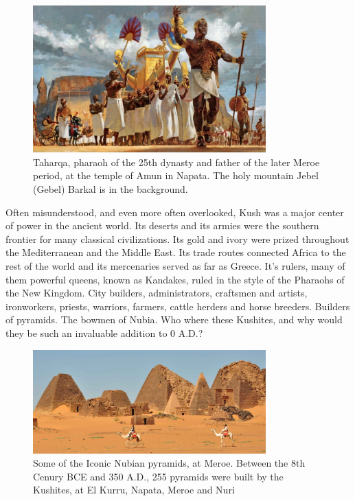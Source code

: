 \documentclass[a4paper,12pt]{scrreprt}
\begin{document}
\begin{figure}[H]
	\centering
	\includegraphics[width=0.8\textwidth]{img/taharqa_pharaoh}
	\caption{Taharqa, pharaoh of the 25th dynasty and father of the later Meroe period, at the temple of Amun in Napata. The holy mountain Jebel (Gebel) Barkal is in the background.}
\end{figure}

Often misunderstood, and even more often overlooked, Kush was a major center of power in the ancient world. Its deserts and its armies were the southern frontier for many classical civilizations. Its gold and ivory were prized throughout the Mediterranean and the Middle East. Its trade routes connected Africa to the rest of the world and its mercenaries served as far as Greece. It’s rulers, many of them powerful queens, known as Kandakes, ruled in the style of the Pharaohs of the New Kingdom. City builders, administrators, craftsmen and artists, ironworkers, priests, warriors, farmers, cattle herders and horse breeders. Builders of pyramids. The bowmen of Nubia. Who where these Kushites, and why would they be such an invaluable addition to 0 A.D.?

\begin{figure}[H]
	\centering
	\includegraphics[width=0.8\textwidth]{img/meroe_pyramids}
	\caption{Some of the Iconic Nubian pyramids, at Meroe. Between the 8th Cenury BCE and 350 A.D., 255 pyramids were built by the Kushites, at El Kurru, Napata, Meroe and Nuri}
\end{figure}
\end{document}
